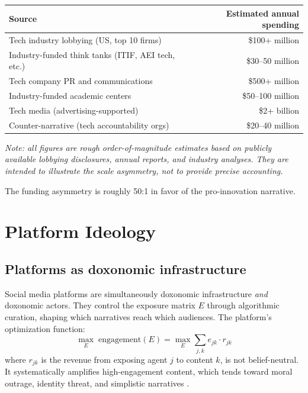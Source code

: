 \begin{center}
\begin{tabular}{lr}
\toprule
Source & Estimated annual spending \\
\midrule
Tech industry lobbying (US, top 10 firms) & \$100+ million \\
Industry-funded think tanks (ITIF, AEI tech, etc.) & \$30--50 million \\
Tech company PR and communications & \$500+ million \\
Industry-funded academic centers & \$50--100 million \\
Tech media (advertising-supported) & \$2+ billion \\
\midrule
Counter-narrative (tech accountability orgs) & \$20--40 million \\
\bottomrule
\end{tabular}
\end{center}
\noindent\textit{Note: all figures are rough order-of-magnitude estimates based on publicly available lobbying disclosures, annual reports, and industry analyses. They are intended to illustrate the scale asymmetry, not to provide precise accounting.}

The funding asymmetry is roughly 50:1 in favor of the pro-innovation narrative.

\section{Platform Ideology}
\label{sec:ch28-platforms}

\subsection{Platforms as doxonomic infrastructure}

\begin{model}
\label{mod:platform}
Social media platforms are simultaneously doxonomic infrastructure \emph{and} doxonomic actors.
They control the exposure matrix $E$ through algorithmic curation, shaping which narratives reach which audiences.
The platform's optimization function:
\[
  \max_E \; \text{engagement}(E) = \max_E \sum_{j,k} e_{jk} \cdot r_{jk}
\]
where $r_{jk}$ is the revenue from exposing agent $j$ to content $k$, is not belief-neutral.
It systematically amplifies high-engagement content, which tends toward moral outrage, identity threat, and simplistic narratives \autocite{zuboff2019}.
\end{model}

